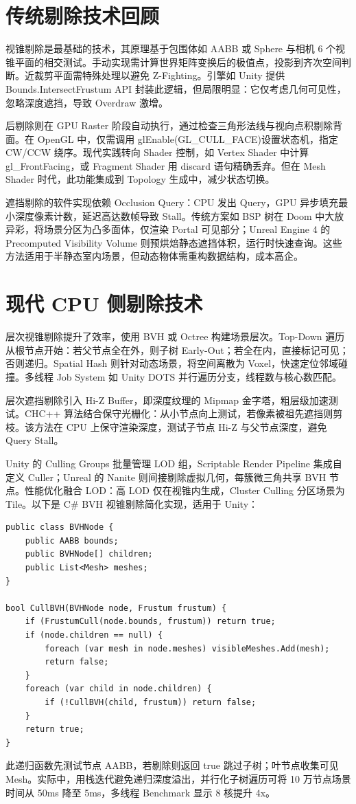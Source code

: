 \chapter{传统剔除技术回顾}
视锥剔除是最基础的技术，其原理基于包围体如 AABB 或 Sphere 与相机 6 个视锥平面的相交测试。手动实现需计算世界矩阵变换后的极值点，投影到齐次空间判断。近裁剪平面需特殊处理以避免 Z-Fighting。引擎如 Unity 提供 Bounds.IntersectFrustum API 封装此逻辑，但局限明显：它仅考虑几何可见性，忽略深度遮挡，导致 Overdraw 激增。\par
后剔除则在 GPU Raster 阶段自动执行，通过检查三角形法线与视向点积剔除背面。在 OpenGL 中，仅需调用 glEnable(GL\_{}CULL\_{}FACE)设置状态机，指定 CW/CCW 绕序。现代实践转向 Shader 控制，如 Vertex Shader 中计算 gl\_{}FrontFacing，或 Fragment Shader 用 discard 语句精确丢弃。但在 Mesh Shader 时代，此功能集成到 Topology 生成中，减少状态切换。\par
遮挡剔除的软件实现依赖 Occlusion Query：CPU 发出 Query，GPU 异步填充最小深度像素计数，延迟高达数帧导致 Stall。传统方案如 BSP 树在 Doom 中大放异彩，将场景分区为凸多面体，仅渲染 Portal 可见部分；Unreal Engine 4 的 Precomputed Visibility Volume 则预烘焙静态遮挡体积，运行时快速查询。这些方法适用于半静态室内场景，但动态物体需重构数据结构，成本高企。\par
\chapter{现代 CPU 侧剔除技术}
层次视锥剔除提升了效率，使用 BVH 或 Octree 构建场景层次。Top-Down 遍历从根节点开始：若父节点全在外，则子树 Early-Out；若全在内，直接标记可见；否则递归。Spatial Hash 则针对动态场景，将空间离散为 Voxel，快速定位邻域碰撞。多线程 Job System 如 Unity DOTS 并行遍历分支，线程数与核心数匹配。\par
层次遮挡剔除引入 Hi-Z Buffer，即深度纹理的 Mipmap 金字塔，粗层级加速测试。CHC++ 算法结合保守光栅化：从小节点向上测试，若像素被祖先遮挡则剪枝。该方法在 CPU 上保守渲染深度，测试子节点 Hi-Z 与父节点深度，避免 Query Stall。\par
Unity 的 Culling Groups 批量管理 LOD 组，Scriptable Render Pipeline 集成自定义 Culler；Unreal 的 Nanite 则间接剔除虚拟几何，每簇微三角共享 BVH 节点。性能优化融合 LOD：高 LOD 仅在视锥内生成，Cluster Culling 分区场景为 Tile。以下是 C\#{} BVH 视锥剔除简化实现，适用于 Unity：\par
\begin{lstlisting}
public class BVHNode {
    public AABB bounds;
    public BVHNode[] children;
    public List<Mesh> meshes;
}

bool CullBVH(BVHNode node, Frustum frustum) {
    if (FrustumCull(node.bounds, frustum)) return true;
    if (node.children == null) {
        foreach (var mesh in node.meshes) visibleMeshes.Add(mesh);
        return false;
    }
    foreach (var child in node.children) {
        if (!CullBVH(child, frustum)) return false;
    }
    return true;
}
\end{lstlisting}
此递归函数先测试节点 AABB，若剔除则返回 true 跳过子树；叶节点收集可见 Mesh。实际中，用栈迭代避免递归深度溢出，并行化子树遍历可将 10 万节点场景时间从 50ms 降至 5ms，多线程 Benchmark 显示 8 核提升 4x。\par

